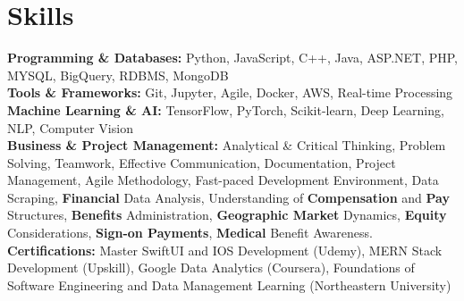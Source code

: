 \documentclass[a4paper,10pt]{article}
\begin{document}
\section*{Skills}
\textbf{Programming \& Databases: } Python, JavaScript, C++, Java, ASP.NET, PHP, MYSQL, BigQuery, RDBMS, MongoDB \\
\textbf{Tools \& Frameworks:}   Git, Jupyter, Agile, Docker, AWS, Real-time Processing\\
\textbf{Machine Learning \& AI: } TensorFlow, PyTorch, Scikit-learn, Deep Learning, NLP, Computer Vision  \\
\textbf{Business \& Project Management: } Analytical \& Critical Thinking, Problem Solving, Teamwork, Effective Communication, Documentation, Project Management, Agile Methodology, Fast-paced Development Environment, Data Scraping, \textbf{Financial} Data Analysis, Understanding of \textbf{Compensation} and \textbf{Pay} Structures, \textbf{Benefits} Administration, \textbf{Geographic Market} Dynamics, \textbf{Equity} Considerations, \textbf{Sign-on Payments}, \textbf{Medical} Benefit Awareness.\\
\textbf{Certifications:} Master SwiftUI and IOS Development (Udemy), MERN Stack Development (Upskill), Google Data Analytics (Coursera), Foundations of Software Engineering and Data Management Learning (Northeastern University) \\

\vspace{-4mm}
\end{document}
